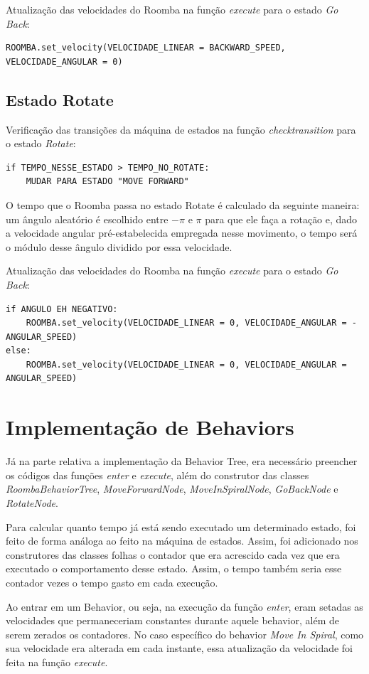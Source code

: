 \documentclass[conference]{IEEEtran}
\begin{document}
Atualização das velocidades do Roomba na função \textit{execute} para o estado \textit{Go Back}:
\begin{lstlisting}
ROOMBA.set_velocity(VELOCIDADE_LINEAR = BACKWARD_SPEED, VELOCIDADE_ANGULAR = 0)
\end{lstlisting}

\subsection{Estado Rotate}
Verificação das transições da máquina de estados na função \textit{check\underline{\space}transition} para o estado \textit{Rotate}:
\begin{lstlisting}
if TEMPO_NESSE_ESTADO > TEMPO_NO_ROTATE:
	MUDAR PARA ESTADO "MOVE FORWARD"
\end{lstlisting}

O tempo que o Roomba passa no estado Rotate é calculado da seguinte maneira: um ângulo aleatório é escolhido entre $-\pi$ e $\pi$ para que ele faça a rotação e, dado a velocidade angular pré-estabelecida empregada nesse movimento, o tempo será o módulo desse ângulo dividido por essa velocidade.

Atualização das velocidades do Roomba na função \textit{execute} para o estado \textit{Go Back}:
\begin{lstlisting}
if ANGULO EH NEGATIVO:
	ROOMBA.set_velocity(VELOCIDADE_LINEAR = 0, VELOCIDADE_ANGULAR = -ANGULAR_SPEED)
else:
	ROOMBA.set_velocity(VELOCIDADE_LINEAR = 0, VELOCIDADE_ANGULAR = ANGULAR_SPEED)
\end{lstlisting}

\section{Implementação de Behaviors}
Já na parte relativa a implementação da Behavior Tree, era necessário preencher os códigos das funções \textit{enter} e \textit{execute}, além do construtor das classes \textit{RoombaBehaviorTree}, \textit{MoveForwardNode}, \textit{MoveInSpiralNode}, \textit{GoBackNode} e \textit{RotateNode}.

Para calcular quanto tempo já está sendo executado um determinado estado, foi feito de forma análoga ao feito na máquina de estados. Assim, foi adicionado nos construtores das classes folhas o contador que era acrescido cada vez que era executado o comportamento desse estado. Assim, o tempo também seria esse contador vezes o tempo gasto em cada execução.

Ao entrar em um Behavior, ou seja, na execução da função \textit{enter}, eram setadas as velocidades que permaneceriam constantes durante aquele behavior, além de serem zerados os contadores. No caso específico do behavior \textit{Move In Spiral}, como sua velocidade era alterada em cada instante, essa atualização da velocidade foi feita na função \textit{execute}.
\end{document}
